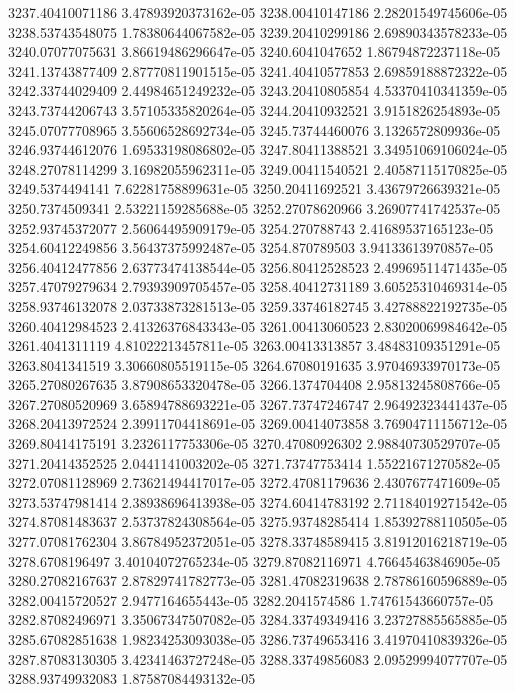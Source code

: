 {3237.40410071186 3.47893920373162e-05
3238.00410147186 2.28201549745606e-05
3238.53743548075 1.78380644067582e-05
3239.20410299186 2.69890343578233e-05
3240.07077075631 3.86619486296647e-05
3240.6041047652 1.86794872237118e-05
3241.13743877409 2.87770811901515e-05
3241.40410577853 2.69859188872322e-05
3242.33744029409 2.44984651249232e-05
3243.20410805854 4.53370410341359e-05
3243.73744206743 3.57105335820264e-05
3244.20410932521 3.9151826254893e-05
3245.07077708965 3.55606528692734e-05
3245.73744460076 3.1326572809936e-05
3246.93744612076 1.69533198086802e-05
3247.80411388521 3.34951069106024e-05
3248.27078114299 3.16982055962311e-05
3249.00411540521 2.40587115170825e-05
3249.5374494141 7.62281758899631e-05
3250.20411692521 3.43679726639321e-05
3250.7374509341 2.53221159285688e-05
3252.27078620966 3.26907741742537e-05
3252.93745372077 2.56064495909179e-05
3254.270788743 2.41689537165123e-05
3254.60412249856 3.56437375992487e-05
3254.870789503 3.94133613970857e-05
3256.40412477856 2.63773474138544e-05
3256.80412528523 2.49969511471435e-05
3257.47079279634 2.79393909705457e-05
3258.40412731189 3.60525310469314e-05
3258.93746132078 2.03733873281513e-05
3259.33746182745 3.42788822192735e-05
3260.40412984523 2.41326376843343e-05
3261.00413060523 2.83020069984642e-05
3261.4041311119 4.81022213457811e-05
3263.00413313857 3.48483109351291e-05
3263.8041341519 3.30660805519115e-05
3264.67080191635 3.97046933970173e-05
3265.27080267635 3.87908653320478e-05
3266.1374704408 2.95813245808766e-05
3267.27080520969 3.65894788693221e-05
3267.73747246747 2.96492323441437e-05
3268.20413972524 2.39911704418691e-05
3269.00414073858 3.76904711156712e-05
3269.80414175191 3.2326117753306e-05
3270.47080926302 2.98840730529707e-05
3271.20414352525 2.0441141003202e-05
3271.73747753414 1.55221671270582e-05
3272.07081128969 2.73621494417017e-05
3272.47081179636 2.4307677471609e-05
3273.53747981414 2.38938696413938e-05
3274.60414783192 2.71184019271542e-05
3274.87081483637 2.53737824308564e-05
3275.93748285414 1.85392788110505e-05
3277.07081762304 3.86784952372051e-05
3278.33748589415 3.81912016218719e-05
3278.6708196497 3.40104072765234e-05
3279.87082116971 4.76645463846905e-05
3280.27082167637 2.87829741782773e-05
3281.47082319638 2.78786160596889e-05
3282.00415720527 2.9477164655443e-05
3282.2041574586 1.74761543660757e-05
3282.87082496971 3.35067347507082e-05
3284.33749349416 3.23727885565885e-05
3285.67082851638 1.98234253093038e-05
3286.73749653416 3.41970410839326e-05
3287.87083130305 3.42341463727248e-05
3288.33749856083 2.09529994077707e-05
3288.93749932083 1.87587084493132e-05
}
